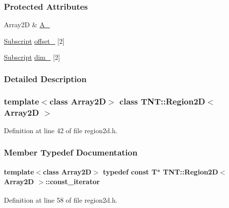 \subsubsection*{Protected Attributes}
\begin{DoxyCompactItemize}
\item 
Array2D \& \hyperlink{class_t_n_t_1_1_region2_d_a358f05643484fd316939ef455b1c8111}{A\_\-}
\item 
\hyperlink{namespace_t_n_t_af22e3f1460e145c04ce4e7d701e4c1c1}{Subscript} \hyperlink{class_t_n_t_1_1_region2_d_a8e2c49eaa2a10d976de943a3df8c1989}{offset\_\-} \mbox{[}2\mbox{]}
\item 
\hyperlink{namespace_t_n_t_af22e3f1460e145c04ce4e7d701e4c1c1}{Subscript} \hyperlink{class_t_n_t_1_1_region2_d_a6fe119c6ecc8e92a22b5283d0ff9a01e}{dim\_\-} \mbox{[}2\mbox{]}
\end{DoxyCompactItemize}


\subsubsection{Detailed Description}
\subsubsection*{template$<$class Array2D$>$ class TNT::Region2D$<$ Array2D $>$}



Definition at line 42 of file region2d.h.



\subsubsection{Member Typedef Documentation}
\paragraph[{const\_\-iterator}]{\setlength{\rightskip}{0pt plus 5cm}template$<$class Array2D$>$ typedef const {\bf T}$\ast$ {\bf TNT::Region2D}$<$ Array2D $>$::{\bf const\_\-iterator}}\hfill\label{class_t_n_t_1_1_region2_d_a97694d94a4cf5d7e51f58575f0779792}


Definition at line 58 of file region2d.h.

